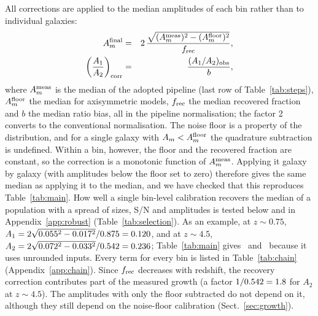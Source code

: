 \documentclass[fleqn,usenatbib]{mnras}
\begin{document}
All corrections are applied to the median amplitudes of each bin rather than
to individual galaxies:
\begin{eqnarray}
A_m^{\rm final} &=& 2\,\frac{\sqrt{(A_m^{\rm meas})^2-(A_m^{\rm floor})^2}}{f_{\rm rec}}, \nonumber\\
\left(\frac{A_1}{A_2}\right)_{\rm corr} &=& \frac{(A_1/A_2)_{\rm obs}}{b},
\label{eq:chain}
\end{eqnarray}
where $A_m^{\rm meas}$ is the median of the adopted pipeline (last row of
Table~\ref{tab:steps}), $A_m^{\rm floor}$ the median for axisymmetric models,
$f_{\rm rec}$ the median recovered fraction and $b$ the median ratio bias, all in
the pipeline normalisation; the factor 2 converts to the conventional
normalisation. The noise floor is a property of the distribution, and for a
single galaxy with $A_m<A_m^{\rm floor}$ the quadrature subtraction is
undefined. Within a bin, however, the floor and the recovered fraction are
constant, so the correction is a monotonic function of $A_m^{\rm meas}$. Applying
it galaxy by galaxy (with amplitudes below the floor set to zero) therefore
gives the same median as applying it to the median, and we have checked that
this reproduces Table~\ref{tab:main}. How well a single bin-level calibration
recovers the median of a population with a spread of sizes, S/N and amplitudes
is tested below and in Appendix~\ref{app:robust} (Table~\ref{tab:selection}). As an example, at $z\sim0.75$,
$A_1=2\sqrt{0.055^2-0.017^2}/0.875=0.120$, and at
$z\sim4.5$, $A_2=2\sqrt{0.072^2-0.033^2}/0.542=0.236$;
Table~\ref{tab:main} gives \numExAtable\ and \numExBtable\ because it uses
unrounded inputs. Every term for every bin is listed in Table~\ref{tab:chain}
(Appendix~\ref{app:chain}). Since $f_{\rm rec}$ decreases with redshift, the
recovery correction contributes part of the measured growth (a factor
$1/0.542=1.8$ for $A_2$ at $z\sim4.5$). The amplitudes with only the
floor subtracted do not depend on it, although they still depend on the
noise-floor calibration (Sect.~\ref{sec:growth}).
\end{document}
